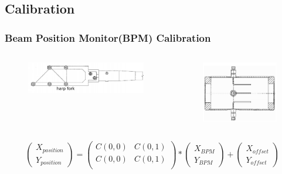 \documentclass[12pt]{beamer}
\begin{document}
\subsection[Calibration]{Calibration}
\begin{frame}
\frametitle{Beam Position Monitor(BPM) Calibration}

	\begin{columns}
		\begin{figure}
			\includegraphics[width=5.5cm]{../images/Thesis/harp.png}
		\end{figure}

		\begin{figure}
			\includegraphics[width=3.5cm]{../images/Thesis/BPM.png}
		\end{figure}		
	\end{columns}	
		\centering
		\begin{equation}
			
			\begin{pmatrix}
			X_{position}\\
			Y_{position}
			\end{pmatrix}
			=
			\begin{pmatrix}
			C(0,0) & C(0,1)\\
			C(0,0) & C(0,1)\\
			\end{pmatrix}
			*
			\begin{pmatrix}
			X_{BPM}\\
			Y_{BPM}
			\end{pmatrix}
			+
			\begin{pmatrix}
			X_{offset}\\
			Y_{offset}
			\end{pmatrix}
			\nonumber			 
		\end{equation}
		
\end{frame}
\end{document}
